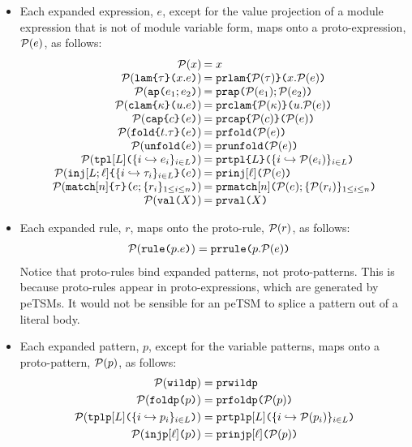 \begin{itemize}
  \item Each expanded expression, $e$, except for the value projection of a module expression that is not of module variable form, maps onto a proto-expression, $\mathcal{P}(e)$, as follows:
  \[\arraycolsep=1pt\begin{array}{rl}
  \Cof{x} & = x\\
  \Cof{\aelam{\tau}{x}{e}} & = \acelam{\Cof{\tau}}{x}{\Cof{e}}\\
  \Cof{\aeap{e_1}{e_2}} & = \aceap{\Cof{e_1}}{\Cof{e_2}}\\
  \Cof{\aeclam{\kappa}{u}{e}} & = \aceclam{\Cof{\kappa}}{u}{\Cof{e}}\\
  \Cof{\aecap{e}{c}} & = \acecap{\Cof{e}}{\Cof{c}}\\
  \Cof{\aefold{t}{\tau}{e}} & = \acefold{\Cof e}\\
  \Cof{\aeunfold{e}} & = \aceunfold{\Cof{e}}\\
  \Cof{\aetpl{\labelset}{\mapschema{e}{i}{\labelset}}} & = \acetpl{\labelset}{\mapschemax{\Cofv}{e}{i}{\labelset}}\\
  \Cof{\aein{\labelset}{\ell}{\mapschema{\tau}{i}{\labelset}}{e}} &= \acein{\ell}{\Cof{e}}\\
  \Cof{\aematchwith{n}{\tau}{e}{\seqschemaX{r}}} & = \acematchwith{n}{\Cof{e}}{\seqschemaXx{\Cofv}{r}}\\
  \Cof{\amval{X}} & = \acemval{X}
  \end{array}\]
  \item Each expanded rule, $r$, maps onto the proto-rule, $\mathcal{P}(r)$, as follows:
  \begin{align*}
  \mathcal{P}(\texttt{rule}\texttt{(}p.e\texttt{)}) & = \texttt{prrule}\texttt{(}p.\mathcal{P}(e)\texttt{)}
  \end{align*}
  Notice that proto-rules bind expanded patterns, not proto-patterns. This is because proto-rules appear in proto-expressions, which are generated by peTSMs. It would not be sensible for an peTSM to splice a pattern out of a literal body.
  \item Each expanded pattern, $p$, except for the variable patterns, maps onto a proto-pattern, $\mathcal{P}(p)$, as follows:
  \begin{align*}
  \mathcal{P}(\texttt{wildp}) & = \texttt{prwildp}\\
  \mathcal{P}(\texttt{foldp}\texttt{(}p\texttt{)}) & = \texttt{prfoldp}\texttt{(}\mathcal{P}(p)\texttt{)}\\
  \mathcal{P}(\texttt{tplp}[L]\texttt{(}\{i \hookrightarrow p_{i}\}_{i \in L}\texttt{)}) & = \texttt{prtplp}[L]\texttt{(}\{i \hookrightarrow \mathcal{P}(p_{i})\}_{i \in L}\texttt{)}\\
  \mathcal{P}(\texttt{injp}[\ell]\texttt{(}p\texttt{)}) & = \texttt{prinjp}[\ell]\texttt{(}\mathcal{P}(p)\texttt{)}
  \end{align*}
\end{itemize}

